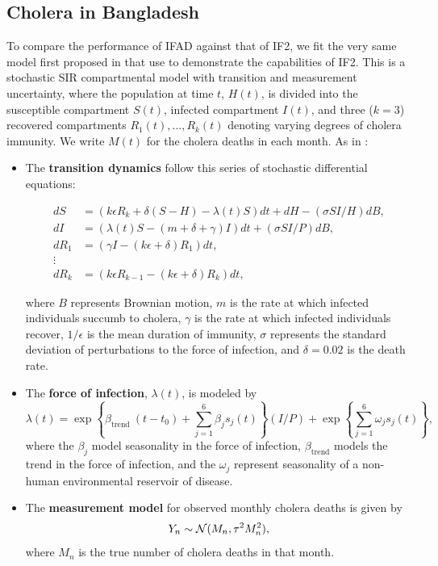 \documentclass{article}
\begin{document}
\subsection{Cholera in Bangladesh}

To compare the performance of IFAD against that of IF2, we fit the very same model first proposed in \cite{king08} that \cite{ionides15} use to demonstrate the capabilities of IF2. This is a stochastic SIR compartmental model with transition and measurement uncertainty, where the population at time $t$, $H(t)$, is divided into the susceptible compartment $S(t)$, infected compartment $I(t)$, and three ($k=3$) recovered compartments $R_1(t), ..., R_k(t)$ denoting varying degrees of cholera immunity. We write $M(t)$ for the cholera deaths in each month. As in \cite{ionides15}:

\begin{itemize}
    \item The \textbf{transition dynamics} follow this series of stochastic differential equations:

    \begin{align}
        d S&=\left(k \epsilon R_k+\delta(S-H)-\lambda(t) S\right) d t+d H-(\sigma S I / H) d B, \\ 
        d I&=\left(\lambda(t) S-(m+\delta+\gamma) I\right) d t+(\sigma S I / P) d B, \\ 
        d R_1&=\left(\gamma I-(k \epsilon+\delta) R_1\right) d t, \\ 
        \vdots \\ 
        d R_k&=\left(k \epsilon R_{k-1}-(k \epsilon+\delta) R_k\right) d t,
    \end{align}
    
    where $B$ represents Brownian motion, $m$ is the rate at which infected individuals succumb to cholera, $\gamma$ is the rate at which infected individuals recover, $1/\epsilon$ is the mean duration of immunity, $\sigma$ represents the standard deviation of perturbations to the force of infection, and $\delta=0.02$ is the death rate. 

    \item The \textbf{force of infection}, $\lambda(t)$, is modeled by
    \begin{equation}
        \lambda(t)=\exp \left\{\beta_{\text {trend }}\left(t-t_0\right)+\sum_{j=1}^{6} \beta_j s_j(t)\right\}(I / P) + \exp \left\{\sum_{j=1}^{6} \omega_j s_j(t)\right\},
    \end{equation}
    where the $\beta_j$ model seasonality in the force of infection, $\beta_{\text{trend}}$ models the trend in the force of infection, and the $\omega_j$ represent seasonality of a non-human environmental reservoir of disease. 
    \item The \textbf{measurement model} for observed monthly cholera deaths is given by 
    \begin{equation}
        Y_n \sim {\mathcal{N}}(M_n, \tau^2M_n^2),
    \end{equation}
    where $M_n$ is the true number of cholera deaths in that month.
\end{itemize}
\end{document}
